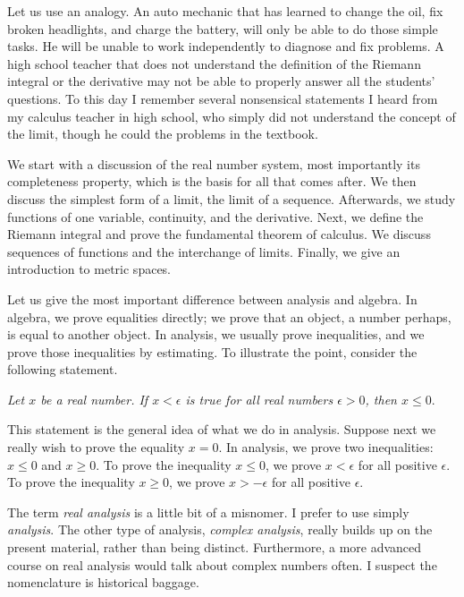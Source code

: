 Let us use an analogy.
An auto mechanic that has learned to change the oil, fix broken headlights,
and charge the battery, will only be able to do those simple tasks.  He
will be unable to work independently to diagnose and fix problems.
A high school teacher that does not understand the definition of the Riemann
integral or the derivative may not be able to properly answer all the
students' questions.
To this day I remember several nonsensical statements I heard
from my calculus teacher in high school, who simply did not understand
the concept of the limit, though he could  the problems in the
textbook.

\medskip

We start with a discussion of the real number system, most importantly
its completeness property, which is the basis for all that comes after.
We then discuss the simplest form of a limit,
the limit of a sequence.  Afterwards, we study
functions of one variable, continuity, and the derivative.
Next, we define the Riemann integral and prove the fundamental theorem of
calculus.  We discuss sequences of functions and the
interchange of limits.  Finally, we give an introduction to metric
spaces.

\medskip

Let us give the most important difference between analysis and algebra.
In algebra, we prove equalities directly;
we prove that an object, a number perhaps, is equal to another object.
In analysis, we usually prove inequalities,
and we prove those inequalities by estimating.
To illustrate the point, consider the following statement.

\medskip

\emph{Let $x$ be a real number.  If $x < \epsilon$ is true for all
real numbers
$\epsilon > 0$, then $x \leq 0$}.

\medskip

This statement is the general idea of what we do in analysis.
Suppose next we really wish to prove the equality
$x = 0$.  In analysis, we prove two inequalities:
$x \leq 0$ and $x \geq 0$.
To
prove the inequality
$x \leq 0$, we prove 
$x < \epsilon$ for all positive $\epsilon$.
To
prove the inequality
$x \geq 0$, we prove 
$x > -\epsilon$ for all positive $\epsilon$.

\medskip

The term \emph{real analysis} is a little bit of a misnomer.  I prefer to
use simply \emph{analysis}.  The other type of analysis, 
\emph{complex analysis}, really builds up on the present material, rather than
being distinct.  Furthermore, a more advanced course on real
analysis would talk about complex numbers often.
I suspect the nomenclature is
historical baggage.

